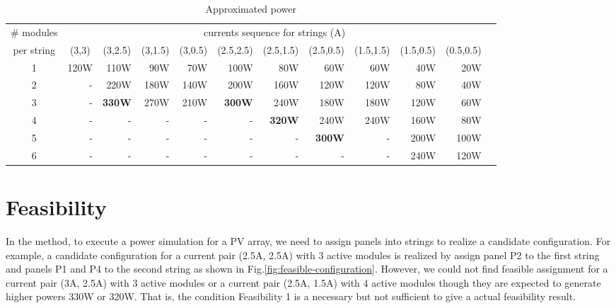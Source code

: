 \documentclass[conference]{pvsctran}
\begin{document}
\begin{table}[t]
\caption{Approximated power}
\label{tab:powers}
\centering
\begin{tabular}{c|rrrrrrrrrrr}
\hline\hline	
\# modules & 	\multicolumn{10}{c}{currents sequence for strings (A)} \\ 																
per string		&	\multicolumn{1}{c}{(3,3)}	&	\multicolumn{1}{c}{(3,2.5)}	&	\multicolumn{1}{c}{(3,1.5)}	&	\multicolumn{1}{c}{(3,0.5)}	&	\multicolumn{1}{c}{(2.5,2.5)}	&	\multicolumn{1}{c}{(2.5,1.5)}	&	\multicolumn{1}{c}{(2.5,0.5)}	&	\multicolumn{1}{c}{(1.5,1.5)}	&	\multicolumn{1}{c}{(1.5,0.5)}	&	\multicolumn{1}{c}{(0.5,0.5)}	\\ \hline
	1	&	120W	&	110W	&	90W	&	70W	&	100W	&	80W	&	60W	&	60W	&	40W	&	20W	\\ \hline
	2	&	-	&	220W	&	180W	&	140W	&	200W	&	160W	&	120W	&	120W	&	80W	&	40W	\\ \hline	3	&	-	&\textbf{330W}&	270W	&	210W	&	\textbf{300W}	&	240W	&	180W	&	180W	&	120W	&	60W	\\ \hline
4	&	-	&	-	&	-	&	-	&	-	&	\textbf{320W}	&	240W	&	240W	&	160W	&	80W	\\ \hline
	 5	&	-	&	-	&	-	&	-	&	-	&	-	&	\textbf{300W}	&	-	&	200W	&	100W	\\ \hline
	6	&	-	&	-	&	-	&	-	&	-	&	-	&	-	&	-	&	240W	&	120W	\\ \hline
\end{tabular}
\end{table}

\section{Feasibility}
In the method\cite{orozco2016optimized}, to execute a power simulation for a PV array, we need to assign panels into strings to realize a candidate configuration. 
For example, a candidate configuration for a current pair (2.5A, 2.5A) with 3 active modules is realized by assign panel P2  to the first string and panels P1 and P4 to the second string as shown in Fig.\ref{fig:feasible-configuration}. 
However, we could not find feasible assignment for a current pair (3A, 2.5A) with 3 active modules or a current pair (2.5A, 1.5A) with 4 active modules though they are expected to generate higher powers 330W or 320W. 
That is, the condition Feasibility 1 is a necessary but not sufficient to give a actual feasibility result.
\end{document}
